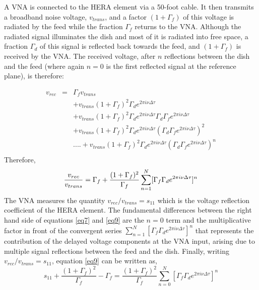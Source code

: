 \documentclass[twocolumn]{emulateapj}
\newcommand{\volt}{{v}}
\newcommand{\dfngexp}{{e^{2\pi i\nu \Delta \tau}}}
\begin{document}
 A VNA is connected to the HERA element via a 50-foot cable. It then transmits a broadband noise voltage, $\volt_{trans}$, and a factor $(1+\Gamma_f)$ of this voltage is radiated by the feed while the fraction $\Gamma_{f}$ returns to the VNA. Although the radiated signal illuminates the dish and most of it is radiated into free space, a fraction $\Gamma_d$ of this signal is reflected back towards the feed, and $(1+\Gamma_f)$ is received by the VNA.  The received voltage, after $n$ reflections between the dish and the feed (where again $n=0$ is the first reflected signal at the reference plane), is therefore:

\begin{eqnarray}
\volt_{rec} & = &  \Gamma_f \volt_{trans} \nonumber \\
         && + \volt_{trans} (1+\Gamma_f)^2 \Gamma_{d} \dfngexp \nonumber \\
         && + \volt_{trans} (1+\Gamma_f)^2 \Gamma_{d} \dfngexp \Gamma_d\Gamma_f\dfngexp \nonumber \\
         && + \volt_{trans} (1+\Gamma_f)^2 \Gamma_{d} \dfngexp (\Gamma_d\Gamma_f\dfngexp)^2 \nonumber \\
&&  ....+ \volt_{trans} (1+\Gamma_f)^2 \Gamma_{d} \dfngexp (\Gamma_d\Gamma_f\dfngexp)^n \nonumber \\
\label{eq8}
\end{eqnarray}
Therefore, 
\begin{equation}
{\volt_{rec}\over \volt_{trans} } = \Gamma_f + \frac{(1+\Gamma_f)^2}{\Gamma_{f}} \displaystyle\sum\limits_{n=1}^{N} [\Gamma_{f}\Gamma_{d}\dfngexp]^{n}
\label{eq9}
\end{equation}
The VNA measures the quantity $\volt_{rec}/\volt_{trans}=s_{11}$ which is the voltage reflection coefficient of the HERA element.
The fundamental differences between the right hand side of equations \ref{eq7} and \ref{eq9} are the $n=0$ term and the multiplicative factor in front of the convergent series $\displaystyle\sum\limits_{n=1}^{N} [\Gamma_{f}\Gamma_{d}\dfngexp]^{n}$ that represents the contribution of the delayed voltage components at the VNA input, arising due to multiple signal reflections between the feed and the dish. Finally, writing $\volt_{rec}/\volt_{trans}=s_{11}$, equation \ref{eq9} can be written as,
\begin{equation}
s_{11} +\frac{(1+\Gamma_f)^2}{\Gamma_f}-\Gamma_f = \frac{(1+\Gamma_f)^2}{\Gamma_{f}} \displaystyle\sum\limits_{n=0}^{N} [\Gamma_{f}\Gamma_{d}\dfngexp]^{n}
\label{eq10}
\end{equation}
\end{document}
